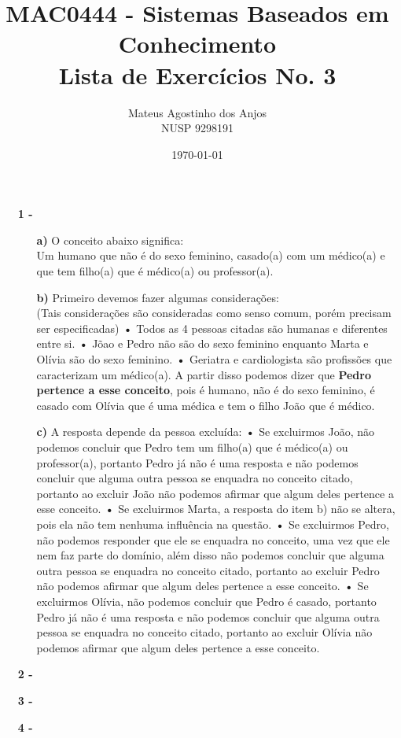 \documentclass[12pt]{article}
\title{MAC0444 - Sistemas Baseados em Conhecimento \\
Lista de Exercícios No. 3
}
\author{Mateus Agostinho dos Anjos\\NUSP 9298191}
\date{\today}
\begin{document}
	\maketitle
	\begin{itemize}
		\item[\textbf{1 -}]
			\hfill\newline
			\begin{itemize}
				\item[\textbf{a) }]
					\hfill\newline
					O conceito abaixo significa:\\
					Um humano que não é do sexo feminino, casado(a) com um médico(a) e que tem filho(a) que
					é médico(a) ou professor(a). 
				\item[\textbf{b) }]
					\hfill\newline
					Primeiro devemos fazer algumas considerações:\\
					(Tais considerações são consideradas como senso comum, porém
					precisam ser especificadas)
					\subitem\textbf{•}
					Todos as 4 pessoas citadas são humanas e diferentes entre si.
					\subitem\textbf{•}
					Jõao e Pedro não são do sexo feminino enquanto Marta e Olívia são do sexo feminino.
					\subitem\textbf{•}
					Geriatra e cardiologista são profissões que caracterizam um médico(a).
					\newline
					A partir disso podemos dizer que \textbf{Pedro pertence a esse conceito}, pois é humano,
					não é do sexo feminino, é casado com Olívia que é uma médica e tem o filho João que é
					médico.
					\newpage
				\item[\textbf{c) }]
					\hfill\newline
					A resposta depende da pessoa excluída:
					\subitem\textbf{•}
					Se excluirmos João, não podemos concluir que Pedro tem um filho(a) que é médico(a) ou
					professor(a), portanto Pedro já não é uma resposta e não podemos concluir que
					alguma outra pessoa se enquadra no conceito citado, portanto ao excluir João não
					podemos afirmar que algum deles pertence a esse conceito.
					\subitem\textbf{•}
					Se excluirmos Marta, a resposta do item b) não se altera, pois ela não tem
					nenhuma influência na questão.
					\subitem\textbf{•}
					Se excluirmos Pedro, não podemos responder que ele se enquadra no conceito, uma
					vez que ele nem faz parte do domínio, além disso não podemos concluir que
					alguma outra pessoa se enquadra no conceito citado, portanto ao excluir Pedro não
					podemos afirmar que algum deles pertence a esse conceito.
					\subitem\textbf{•}
					Se excluirmos Olívia, não podemos concluir que Pedro é casado, portanto Pedro já não 
					é uma resposta e não podemos concluir que alguma outra pessoa se enquadra no conceito
					citado, portanto ao excluir Olívia não
					podemos afirmar que algum deles pertence a esse conceito.
			\end{itemize}
		\item[\textbf{2 -}]
		\item[\textbf{3 -}]
		\item[\textbf{4 -}]
	\end{itemize}
\end{document}
